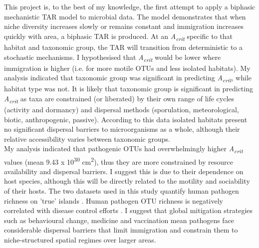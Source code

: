 
\noindent This project is, to the best of my knowledge, the first attempt to apply a biphasic mechanistic TAR model to microbial data. The model demonstrates that when niche diversity increases slowly or remains constant and immigration increases quickly with area, a biphasic TAR is produced. At an \textit{A\textsubscript{crit}} specific to that habitat and taxonomic group, the TAR will transition from deterministic to a stochastic mechanisms. I hypothesised that \textit{A\textsubscript{crit}} would be lower where immigration is higher (i.e. for more motile OTUs and less isolated habitats). My analysis indicated that taxonomic group was significant in predicting \textit{A\textsubscript{crit}}, while habitat type was not. It is likely that taxonomic group is significant in predicting \textit{A\textsubscript{crit}} as taxa are constrained (or liberated) by their own range of life cycles (activity and dormancy) and dispersal methods (sporulation, meteorological, biotic, anthropogenic, passive). According to this data isolated habitats present no significant dispersal barriers to microorganisms as a whole, although their relative accessibility varies between taxonomic groups.\\

\noindent My analysis indicated that pathogenic OTUs had overwhelmingly higher \textit{A\textsubscript{crit}} values (mean 9.43 x 10\textsuperscript{30} cm\textsuperscript{2}), thus they are more constrained by resource availability and dispersal barriers. I suggest this is due to their dependence on host species, although this will be directly related to the motility and sociability of their hosts. The two datasets used in this study quantify human pathogen richness on 'true' islands \cite{jean2016equilibrium}. Human pathogen OTU richness is negatively correlated with disease control efforts \cite{dunn2010global}. I suggest that global mitigation strategies such as behavioural change, medicine and vaccination \cite{nicolaides2020hand} mean pathogens face considerable dispersal barriers that limit immigration and constrain them to niche-structured spatial regimes over larger areas. \\

